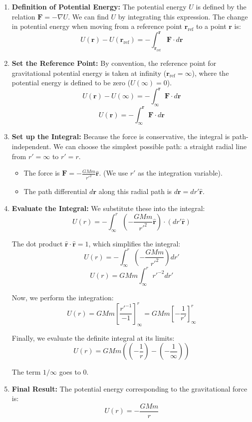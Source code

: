 \documentclass[11pt, a4paper]{article} %
\begin{document}
\begin{enumerate}
    \item \textbf{Definition of Potential Energy:}
    The potential energy $U$ is defined by the relation $\mathbf{F} = -\nabla U$. We can find $U$ by integrating this expression. The change in potential energy when moving from a reference point $\mathbf{r}_{\text{ref}}$ to a point $\mathbf{r}$ is:
    $$U(\mathbf{r}) - U(\mathbf{r}_{\text{ref}}) = - \int_{\mathbf{r}_{\text{ref}}}^{\mathbf{r}} \mathbf{F} \cdot d\mathbf{r}$$

    \item \textbf{Set the Reference Point:}
    By convention, the reference point for gravitational potential energy is taken at infinity ($\mathbf{r}_{\text{ref}} = \infty$), where the potential energy is defined to be zero ($U(\infty) = 0$).
    $$U(\mathbf{r}) - U(\infty) = - \int_{\infty}^{\mathbf{r}} \mathbf{F} \cdot d\mathbf{r}$$
    $$U(\mathbf{r}) = - \int_{\infty}^{\mathbf{r}} \mathbf{F} \cdot d\mathbf{r}$$

    \item \textbf{Set up the Integral:}
    Because the force is conservative, the integral is path-independent. We can choose the simplest possible path: a straight radial line from $r' = \infty$ to $r' = r$.
    \begin{itemize}
        \item The force is $\mathbf{F} = -\frac{GMm}{r'^2}\hat{\mathbf{r}}$. (We use $r'$ as the integration variable).
        \item The path differential $d\mathbf{r}$ along this radial path is $d\mathbf{r} = dr' \hat{\mathbf{r}}$.
    \end{itemize}

    \item \textbf{Evaluate the Integral:}
    We substitute these into the integral:
    $$U(r) = - \int_{\infty}^{r} \left( -\frac{GMm}{r'^2}\hat{\mathbf{r}} \right) \cdot (dr' \hat{\mathbf{r}})$$
    
    The dot product $\hat{\mathbf{r}} \cdot \hat{\mathbf{r}} = 1$, which simplifies the integral:
    $$U(r) = - \int_{\infty}^{r} \left( -\frac{GMm}{r'^2} \right) dr'$$
    $$U(r) = GMm \int_{\infty}^{r} r'^{-2} dr'$$
    
    Now, we perform the integration:
    $$U(r) = GMm \left[ \frac{r'^{-1}}{-1} \right]_{\infty}^{r} = GMm \left[ -\frac{1}{r'} \right]_{\infty}^{r}$$
    
    Finally, we evaluate the definite integral at its limits:
    $$U(r) = GMm \left( \left( -\frac{1}{r} \right) - \left( -\frac{1}{\infty} \right) \right)$$
    
    The term $1/\infty$ goes to $0$.

    \item \textbf{Final Result:}
    The potential energy corresponding to the gravitational force is:
    $$U(r) = -\frac{GMm}{r}$$
\end{enumerate}
\end{document}
